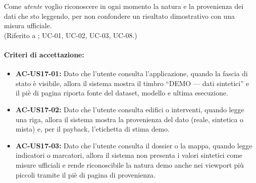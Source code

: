  \label{us:provenienza}
Come \textit{utente} voglio riconoscere in ogni momento la natura e la provenienza dei dati che sto leggendo, per non confondere un risultato dimostrativo con una misura ufficiale. \\ (Riferito a ; UC-01, UC-02, UC-03, UC-08.)

\paragraph{Criteri di accettazione:}
\begin{itemize}[leftmargin=1.4em]
    \item \textbf{AC-US17-01:} Dato che l'utente consulta l'applicazione, quando la fascia di stato è visibile, allora il sistema mostra il timbro ``DEMO --- dati sintetici'' e il piè di pagina riporta fonte del dataset, modello e ultima esecuzione.
    \item \textbf{AC-US17-02:} Dato che l'utente consulta edifici o interventi, quando legge una riga, allora il sistema mostra la provenienza del dato (reale, sintetica o mista) e, per il payback, l'etichetta di stima demo.
    \item \textbf{AC-US17-03:} Dato che l'utente consulta il dossier o la mappa, quando legge indicatori o marcatori, allora il sistema non presenta i valori sintetici come misure ufficiali e rende riconoscibile la natura demo anche nei viewport più piccoli tramite il piè di pagina di provenienza.
\end{itemize}
